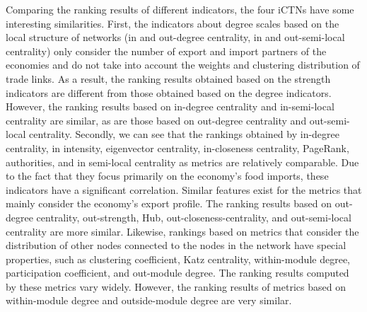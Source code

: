 \documentclass[preprint,3p,times,sort&compress]{elsarticle}
\begin{document}
Comparing the ranking results of different indicators, the four iCTNs have some interesting similarities. First, the indicators about degree scales based on the local structure of networks (in and out-degree centrality, in and out-semi-local centrality) only consider the number of export and import partners of the economies and do not take into account the weights and clustering distribution of trade links. As a result, the ranking results obtained based on the strength indicators are different from those obtained based on the degree indicators. However, the ranking results based on in-degree centrality and in-semi-local centrality are similar, as are those based on out-degree centrality and out-semi-local centrality. Secondly, we can see that the rankings obtained by in-degree centrality, in intensity, eigenvector centrality, in-closeness centrality, PageRank, authorities, and in semi-local centrality as metrics are relatively comparable. Due to the fact that they focus primarily on the economy's food imports, these indicators have a significant correlation. Similar features exist for the metrics that mainly consider the economy's export profile. The ranking results based on out-degree centrality, out-strength, Hub, out-closeness-centrality, and out-semi-local centrality are more similar. Likewise, rankings based on metrics that consider the distribution of other nodes connected to the nodes in the network have special properties, such as clustering coefficient, Katz centrality, within-module degree, participation coefficient, and out-module degree. The ranking results computed by these metrics vary widely. However, the ranking results of metrics based on within-module degree and outside-module degree are very similar.
\end{document}
